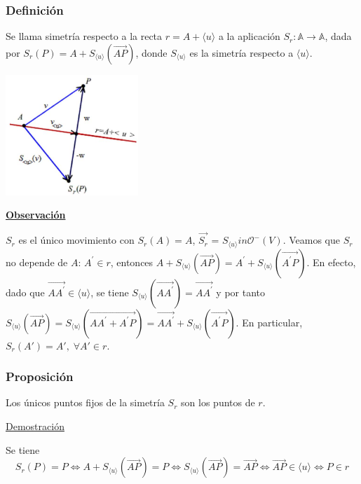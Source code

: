 \documentclass[12pt, a4paper, ones, notitlepage, openany,titlepage]{article}
\newcommand{\demostracion}{\noindent\underline{Demostración}}
\newcommand{\observacion}{\noindent\underline{\textbf{Observación}}}
\begin{document}
\subsubsection{Definición}
Se llama simetría respecto a la recta $r=A+\langle u\rangle$ a la aplicación $S_{r}: \mathbb{A} \rightarrow \mathbb{A}$, dada por $S_{r}(P)=A+S_{\langle u\rangle}(\overrightarrow{A P})$, donde $S_{\langle u\rangle}$ es la simetría respecto a $\langle u\rangle$.
\begin{center}
	\includegraphics[max width=5cm]{2023_04_25_301d1803eaf1bc74cfd9g-080}
\end{center}
\observacion

$S_r$ es el único movimiento con $S_r(A) = A$, $\overrightarrow{S_r}$ = $S_{\langle u \rangle} in \mathcal{O}^-(V)$. Veamos que $S_r$ no depende de $A$: $A^{\prime} \in r$, entonces $A+S_{\langle u\rangle}(\overrightarrow{A P})=A^{\prime}+S_{\langle u\rangle}\left(\overrightarrow{A^{\prime} P}\right)$. En efecto, dado que $\overrightarrow{A A^{\prime}} \in\langle u\rangle$, se tiene $S_{\langle u\rangle}\left(\overrightarrow{A A^{\prime}}\right)=\overrightarrow{A A^{\prime}}$ y por tanto $S_{\langle u\rangle}(\overrightarrow{A P})=S_{\langle u\rangle}\left(\overrightarrow{A A^{\prime}+A^{\prime} P}\right)=\overrightarrow{A A^{\prime}}+S_{\langle u\rangle}\left(\overrightarrow{A^{\prime} P}\right)$. En particular, $S_r(A') = A', \; \forall A' \in r$.

\subsubsection{Proposición}
Los únicos puntos fijos de la simetría $S_{r}$ son los puntos de $r$.

\demostracion

Se tiene
$$
S_{r}(P)=P \Longleftrightarrow A+S_{\langle u\rangle}(\overrightarrow{A P})=P \Longleftrightarrow S_{\langle u\rangle}(\overrightarrow{A P})=\overrightarrow{A P} \Longleftrightarrow \overrightarrow{A P} \in\langle u\rangle \Longleftrightarrow P \in r
$$
\end{document}
